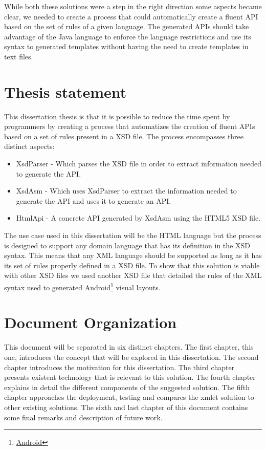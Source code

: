 \noindent
While both these solutions were a step in the right direction some aspects became clear, we needed to create a process that could automatically create a fluent \ac{API} based on the set of rules of a given language. The generated \ac{API}s should take advantage of the Java language to enforce the language restrictions and use its syntax to generated templates without having the need to create templates in text files.

\newpage

\section{Thesis statement}

This dissertation thesis is that it is possible to reduce the time spent by programmers by creating a process that automatizes the creation of fluent \ac{API}s based on a set of rules present in a \ac{XSD} file. The process encompasses three distinct aspects:

\begin{itemize}
	\item XsdParser - Which parses the \ac{XSD} file in order to extract information needed to generate the \ac{API}.
	\item XsdAsm - Which uses XsdParser to extract the information needed to generate the \ac{API} and uses it to generate an \ac{API}.
	\item HtmlApi - A concrete \ac{API} generated by XsdAsm using the \ac{HTML}5 \ac{XSD} file.
\end{itemize}

\noindent
The use case used in this dissertation will be the \ac{HTML} language but the process is designed to support any domain language that has its definition in the \ac{XSD} syntax. This means that any \ac{XML} language should be supported as long as it has its set of rules properly defined in a \ac{XSD} file. To show that this solution is viable with other \ac{XSD} files we used another \ac{XSD} file that detailed the rules of the \ac{XML} syntax used to generated Android\footnote{\href{https://www.android.com/}{Android}} visual layouts.

\section{Document Organization}

This document will be separated in six distinct chapters. The first chapter, this one, introduces the concept that will be explored in this dissertation. The second chapter introduces the motivation for this dissertation. The third chapter presents existent technology that is relevant to this solution. The fourth chapter explains in detail the different components of the suggested solution. The fifth chapter approaches the deployment, testing and compares the \ac{xmlet} solution to other existing solutions. The sixth and last chapter of this document contains some final remarks and description of future work.